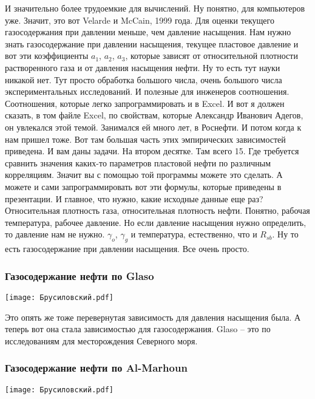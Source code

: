 \documentclass[main.tex]{subfiles}
\begin{document}
И значительно более трудоемкие для вычислений.
Ну понятно, для компьютеров уже.
Значит, это вот Velarde и McCain, 1999 года.
Для оценки текущего газосодержания при давлении меньше, чем давление насыщения.
Нам нужно знать газосодержание при давлении насыщения, текущее пластовое давление и вот эти коэффициенты $a_1$, $a_2$, $a_3$, которые зависят от относительной плотности растворенного газа и от давления насыщения нефти.
Ну то есть тут науки никакой нет.
Тут просто обработка большого числа, очень большого числа экспериментальных исследований.
И полезные для инженеров соотношения.
Соотношения, которые легко запрограммировать и в Excel.
И вот я должен сказать, в том файле Excel, по свойствам, которые Александр Иванович Адегов, он увлекался этой темой.
Занимался ей много лет, в Роснефти.
И потом когда к нам пришел тоже.
Вот там большая часть этих эмпирических зависимостей приведена.
И вам даны задачи.
На втором десятке.
Там всего 15.
Где требуется сравнить значения каких-то параметров пластовой нефти по различным корреляциям.
Значит вы с помощью той программы можете это сделать.
А можете и сами запрограммировать вот эти формулы, которые приведены в презентации.
И главное, что нужно, какие исходные данные еще раз?
Относительная плотность газа, относительная плотность нефти.
Понятно, рабочая температура, рабочее давление.
Но если давление насыщения нужно определить, то давление нам не нужно.
$\gamma_o$, $\gamma_g$ и температура, естественно, что и $R_{sb}$.
Ну то есть газосодержание при давлении насыщения.
Все очень просто.

\subsubsection{Газосодержание нефти по Glaso}

\begin{center}
\texttt{[image: Брусиловский.pdf]}
\end{center}

Это опять же тоже перевернутая зависимость для давления насыщения была.
А теперь вот она стала зависимостью для газосодержания.
Glaso -- это по исследованиям для месторождения Северного моря.

\subsubsection{Газосодержание нефти по Al-Marhoun}

\begin{center}
\texttt{[image: Брусиловский.pdf]}
\end{center}
\end{document}
